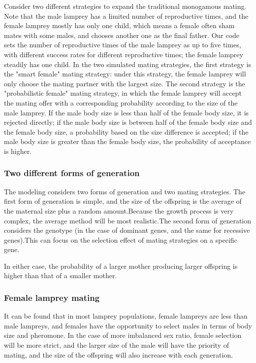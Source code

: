 \documentclass[12pt]{article}
\begin{document}
Consider two different strategies to expand the traditional monogamous mating. Note that the
male lamprey has a limited number of reproductive times, and the female lamprey mostly has
only one child, which means a female often sham mates with some males, and chooses another
one as the final father. Our code sets the number of reproductive times of the male lamprey
as up to five times, with different success rates for different reproductive times; the female
lamprey steadily has one child. In the two simulated mating strategies, the first strategy is
the "smart female" mating strategy: under this strategy, the female lamprey will only choose
the mating partner with the largest size. The second strategy is the "probabilistic female"
mating strategy, in which the female lamprey will accept the mating offer with a corresponding
probability according to the size of the male lamprey. If the male body size is less than
half of the female body size, it is rejected directly; if the male body size is between half
of the female body size and the female body size, a probability based on the size difference
is accepted; if the male body size is greater than the female body size, the probability of acceptance is higher.

\subsubsection{Two different forms of generation}

The modeling considers two forms of generation and two mating strategies. The first form of
generation is simple, and the size of the offspring is the average of the maternal size
plus a random amount.Because the growth process is very complex, the average method will
be most realistic.The second form of generation considers the genotype (in the case of
dominant genes, and the same for recessive genes).This can focus on the selection effect
of mating strategies on a specific gene.

In either case, the probability of a larger mother producing larger offspring is higher
than that of a smaller mother.

\subsubsection{Female lamprey mating}
It can be found that in most lamprey populations, female lampreys are less than male lampreys,
and females have the opportunity to select males in terms of body size and pheromone. In the
case of more imbalanced sex ratio, female selection will be more strict, and the larger
size of the male will have the priority of mating, and the size of the offspring will
also increase with each generation.
\end{document}
